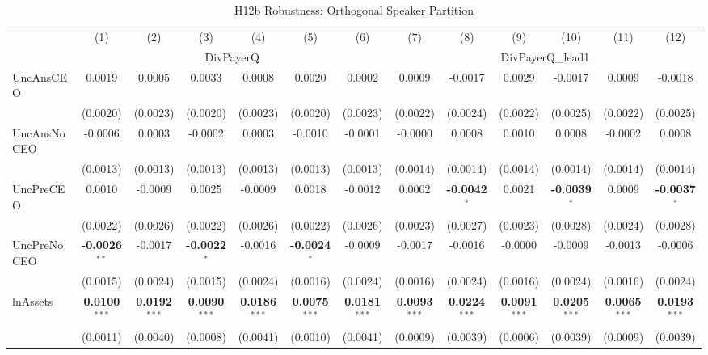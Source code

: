 \begin{landscape}
\begin{table}[H]
\setlength{\tabcolsep}{3pt}
\renewcommand{\arraystretch}{0.85}
\centering
\caption{H12b Robustness: Orthogonal Speaker Partition}
\label{tab:h12b_robust}
\scriptsize
\begin{tabular}{lcccccccccccc}
\toprule
 & (1) & (2) & (3) & (4) & (5) & (6) & (7) & (8) & (9) & (10) & (11) & (12) \\
 & \multicolumn{6}{c}{DivPayerQ} & \multicolumn{6}{c}{DivPayerQ\_lead1} \\
\cmidrule(lr){2-7} \cmidrule(lr){8-13}
\midrule
UncAnsCEO & 0.0019 & 0.0005 & 0.0033 & 0.0008 & 0.0020 & 0.0002 & 0.0009 & -0.0017 & 0.0029 & -0.0017 & 0.0009 & -0.0018 \\
 & (0.0020) & (0.0023) & (0.0020) & (0.0023) & (0.0020) & (0.0023) & (0.0022) & (0.0024) & (0.0022) & (0.0025) & (0.0022) & (0.0025) \\
UncAnsNoCEO & -0.0006 & 0.0003 & -0.0002 & 0.0003 & -0.0010 & -0.0001 & -0.0000 & 0.0008 & 0.0010 & 0.0008 & -0.0002 & 0.0008 \\
 & (0.0013) & (0.0013) & (0.0013) & (0.0013) & (0.0013) & (0.0013) & (0.0014) & (0.0014) & (0.0014) & (0.0014) & (0.0014) & (0.0014) \\
UncPreCEO & 0.0010 & -0.0009 & 0.0025 & -0.0009 & 0.0018 & -0.0012 & 0.0002 & \textbf{-0.0042}$^{*}$ & 0.0021 & \textbf{-0.0039}$^{*}$ & 0.0009 & \textbf{-0.0037}$^{*}$ \\
 & (0.0022) & (0.0026) & (0.0022) & (0.0026) & (0.0022) & (0.0026) & (0.0023) & (0.0027) & (0.0023) & (0.0028) & (0.0024) & (0.0028) \\
UncPreNoCEO & \textbf{-0.0026}$^{**}$ & -0.0017 & \textbf{-0.0022}$^{*}$ & -0.0016 & \textbf{-0.0024}$^{*}$ & -0.0009 & -0.0017 & -0.0016 & -0.0000 & -0.0009 & -0.0013 & -0.0006 \\
 & (0.0015) & (0.0024) & (0.0015) & (0.0024) & (0.0016) & (0.0024) & (0.0016) & (0.0024) & (0.0016) & (0.0024) & (0.0016) & (0.0024) \\
\midrule
lnAssets & \textbf{0.0100}$^{***}$ & \textbf{0.0192}$^{***}$ & \textbf{0.0090}$^{***}$ & \textbf{0.0186}$^{***}$ & \textbf{0.0075}$^{***}$ & \textbf{0.0181}$^{***}$ & \textbf{0.0093}$^{***}$ & \textbf{0.0224}$^{***}$ & \textbf{0.0091}$^{***}$ & \textbf{0.0205}$^{***}$ & \textbf{0.0065}$^{***}$ & \textbf{0.0193}$^{***}$ \\
 & (0.0011) & (0.0040) & (0.0008) & (0.0041) & (0.0010) & (0.0041) & (0.0009) & (0.0039) & (0.0006) & (0.0039) & (0.0009) & (0.0039) \\

\end{tabular}
\end{table}
\end{landscape}
